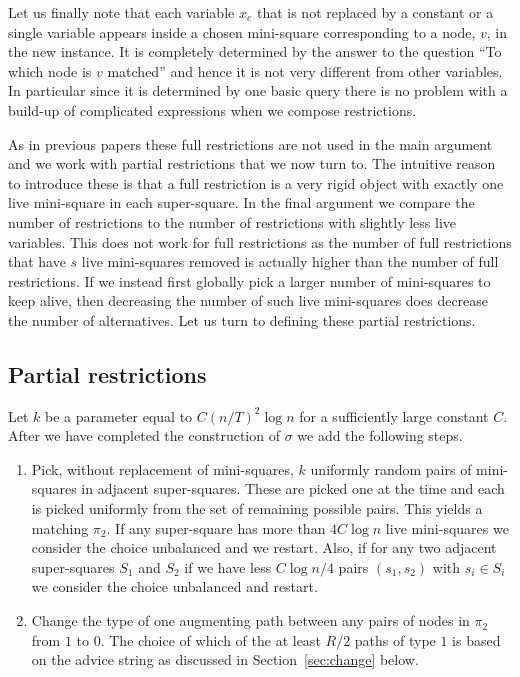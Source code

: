 \documentclass{article}\usepackage[a4paper,margin=20mm]{geometry}
\begin{document}
Let us finally note that each variable $x_e$ that is
not replaced by a constant or a single variable
appears inside a chosen mini-square corresponding
to a node, $v$, in the new instance.  It is completely
determined by the answer to the question ``To which node
is $v$ matched'' and hence it is not very different from
other variables.  In particular since it is determined by
one basic query there is no problem with a build-up
of complicated expressions when we compose restrictions.

As in previous papers these full restrictions
are not used in the main argument and we work
with partial restrictions that we now turn to.
The intuitive reason to introduce these 
is that a full restriction is a very rigid object with exactly
one live mini-square in each super-square.  In the final
argument we compare the number of restrictions to the
number of restrictions with slightly less live variables.
This does not work for full restrictions as the number
of full restrictions that have $s$ live mini-squares 
removed is actually higher than the number of full
restrictions.   If we instead first globally pick
a larger number of mini-squares to keep alive,
then decreasing the number of such live mini-squares
does decrease the number of alternatives. Let us
turn to defining these partial restrictions.

\subsection{Partial restrictions}

Let $k$ be a parameter equal to $C (n/T)^2 \log n$
for a sufficiently large constant $C$.  After
we have completed the construction of $\sigma$
we add the following steps.  \label{distribution}

\begin{enumerate}

\item Pick, without replacement of mini-squares, $k$ uniformly
random pairs of mini-squares in adjacent super-squares.  
These are picked one at the time and each is picked uniformly
from the set of remaining possible pairs.
This yields a matching $\pi_2$.  If any super-square   
has more than $4C \log n$ live mini-squares
we consider the choice unbalanced and we restart.
Also, if for any two adjacent super-squares $S_1$ and $S_2$ 
if we have less $C \log n/4$ 
pairs $(s_1,s_2)$ with $s_i \in S_i$ we consider the choice
unbalanced and
restart.

\item Change the type of one augmenting path between
any pairs of nodes in $\pi_2$ from $1$ to $0$.  The choice of which of
the at least $R/2$ paths of type $1$ is based
on the advice string as discussed in Section~\ref{sec:change}
below.

\end{enumerate}
\end{document}
